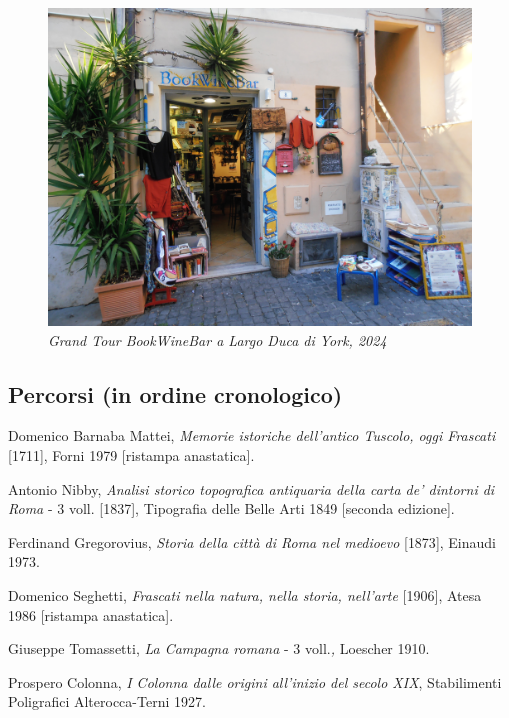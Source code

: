 \documentclass[
  letterpaper,
  DIV=11,
  numbers=noendperiod]{scrartcl}
\begin{document}
\begin{figure}[H]

{\centering \includegraphics{../../images/immagini_bookwinebar/fuori1.JPG}

}

\caption{\emph{Grand Tour BookWineBar a Largo Duca di York, 2024}}

\end{figure}%

\subsection{Percorsi (in ordine
cronologico)}\label{percorsi-in-ordine-cronologico}

Domenico Barnaba Mattei, \emph{Memorie istoriche dell'antico Tuscolo,
oggi Frascati} {[}1711{]}, Forni 1979 {[}ristampa anastatica{]}.

Antonio Nibby, \emph{Analisi storico topografica antiquaria della carta
de' dintorni di Roma} - 3 voll. {[}1837{]}, Tipografia delle Belle Arti
1849 {[}seconda edizione{]}.

Ferdinand Gregorovius, \emph{Storia della città di Roma nel medioevo}
{[}1873{]}, Einaudi 1973.

Domenico Seghetti, \emph{Frascati nella natura, nella storia, nell'arte}
{[}1906{]}, Atesa 1986 {[}ristampa anastatica{]}.

Giuseppe Tomassetti, \emph{La Campagna romana} - 3 voll.\emph{,}
Loescher 1910.

Prospero Colonna, \emph{I Colonna dalle origini all'inizio del secolo
XIX}, Stabilimenti Poligrafici Alterocca-Terni 1927.
\end{document}
